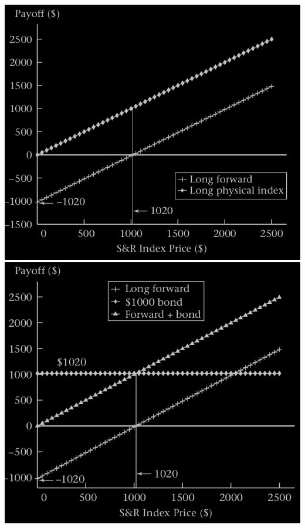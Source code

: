 \begin{frame}[fragile]
\begin{center}
	\includegraphics[scale=0.2]{figs/Figure-2-3.png}
	\includegraphics[scale=0.2]{figs/Figure-2-4.png}
\end{center}
\end{frame}
